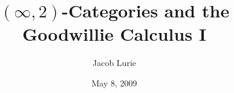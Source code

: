 \documentclass{article}
\theoremstyle{definition}
\begin{document}
\title{$(\infty,2)$-Categories and the Goodwillie Calculus I}
\author{Jacob Lurie}
\date{May 8, 2009}

\maketitle
\tableofcontents

%
%
%
%
%
%

\end{document}
